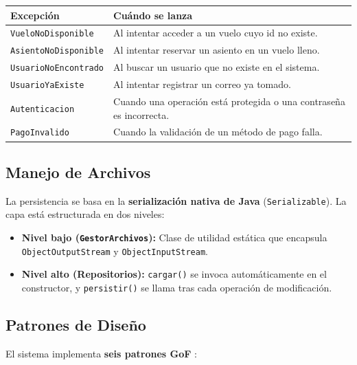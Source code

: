 \documentclass[12pt, letterpaper]{article}
\begin{document}
	\begin{table}[H]
		\centering
		\renewcommand{\arraystretch}{1.2}
		\begin{tabular}{p{4.5cm} p{10cm}}
			\toprule
			\textbf{Excepción} & \textbf{Cuándo se lanza} \\
			\midrule
			\texttt{VueloNoDisponible} & Al intentar acceder a un vuelo cuyo id no existe. \\
			\texttt{AsientoNoDisponible} & Al intentar reservar un asiento en un vuelo lleno. \\
			\texttt{UsuarioNoEncontrado} & Al buscar un usuario que no existe en el sistema. \\
			\texttt{UsuarioYaExiste} & Al intentar registrar un correo ya tomado. \\
			\texttt{Autenticacion} & Cuando una operación está protegida o una contraseña es incorrecta. \\
			\texttt{PagoInvalido} & Cuando la validación de un método de pago falla. \\
			\bottomrule
		\end{tabular}
	\end{table}
	
	\subsection{Manejo de Archivos}
	La persistencia se basa en la \textbf{serialización nativa de Java} (\texttt{Serializable}). La capa está estructurada en dos niveles:
	\begin{itemize}
		\item \textbf{Nivel bajo (\texttt{GestorArchivos}):} Clase de utilidad estática que encapsula \texttt{ObjectOutputStream} y \texttt{ObjectInputStream}.
		\item \textbf{Nivel alto (Repositorios):} \texttt{cargar()} se invoca automáticamente en el constructor, y \texttt{persistir()} se llama tras cada operación de modificación.
	\end{itemize}
	
	\subsection{Patrones de Diseño}
	El sistema implementa \textbf{seis patrones GoF} \cite{gof}:
	
\end{document}
